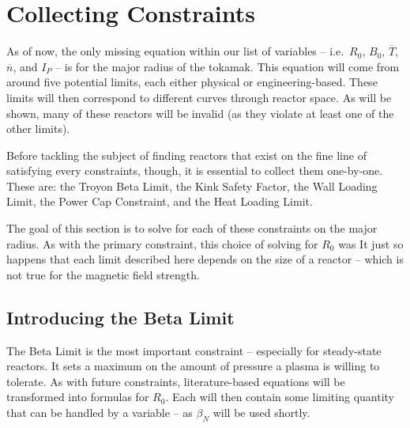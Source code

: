 \section{Collecting  Constraints}

As of now, the only missing equation within our list of  variables -- i.e.\ $R_0$, $B_0$, $\overline T$, $\overline n$, and $I_P$ -- is for the major radius of the tokamak. This equation will come from around five potential limits, each either physical or engineering-based. These limits will then correspond to different curves through reactor space. As will be shown, many of these reactors will be invalid (as they violate at least one of the other limits). 

Before tackling the subject of finding reactors that exist on the fine line of satisfying every  constraints, though, it is essential to collect them one-by-one. These are: the Troyon Beta Limit, the Kink Safety Factor, the Wall Loading Limit, the Power Cap Constraint, and the Heat Loading Limit.

The goal of this section is to solve for each of these constraints on the major radius. As with the primary constraint, this choice of solving for $R_0$ was  It just so happens that each limit described here depends on the size of a reactor -- which is not true for the magnetic field strength.

\subsection{Introducing the Beta Limit}

The Beta Limit is the most important  constraint -- especially for steady-state reactors. It sets a maximum on the amount of pressure a plasma is willing to tolerate. As with future  constraints, literature-based equations will be transformed into formulas for $R_0$. Each will then contain some limiting quantity that can be handled by a  variable -- as $\beta_N$ will be used shortly.

